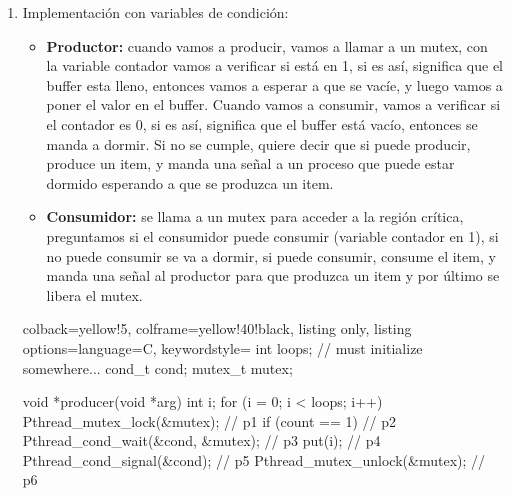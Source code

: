 \documentclass[openany]{book}
\begin{document}
\begin{enumerate}
    \item Implementación con variables de condición: 
    \begin{itemize}
        \item \textbf{Productor:} cuando vamos a producir, vamos a llamar a un mutex, con la variable contador vamos a verificar si está en 1, si es así, significa que el buffer esta lleno, entonces vamos a esperar a que se vacíe, y luego vamos a poner el valor en el buffer. Cuando vamos a consumir, vamos a verificar si el contador es 0, si es así, significa que el buffer está vacío, entonces se manda a dormir. Si no se cumple, quiere decir que si puede producir, produce un item, y manda una señal a un proceso que puede estar dormido esperando a que se produzca un item. 
        \item \textbf{Consumidor:} se llama a un mutex para acceder a la región crítica, preguntamos si el consumidor puede consumir (variable contador en 1), si no puede consumir se va a dormir, si puede consumir, consume el item, y manda una señal al productor para que produzca un item y por último se libera el mutex.
    \end{itemize}
    \begin{tcblisting}{colback=yellow!5, colframe=yellow!40!black, listing only, listing options={language=C, keywordstyle=\color{blue!35!white}\bfseries}}
        int loops; // must initialize somewhere...
        cond_t cond;
        mutex_t mutex;
        
        void *producer(void *arg) {
            int i;
            for (i = 0; i < loops; i++) {
                Pthread_mutex_lock(&mutex); // p1
                if (count == 1) // p2
                    Pthread_cond_wait(&cond, &mutex); // p3
                put(i); // p4
                Pthread_cond_signal(&cond); // p5
                Pthread_mutex_unlock(&mutex); // p6
            }
        }
        

\end{tcblisting}
\end{enumerate}
\end{document}
